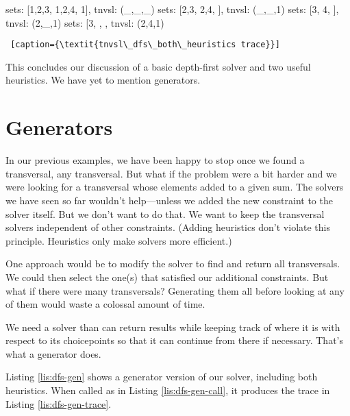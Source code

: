 \midiumlv
\begin{minipage}[c]{0.45\textwidth}
\begin{python1} 
sets: [{1,2,3}, {1,2,4}, {1}], tnvsl: (_,_,_)
  sets: [{2,3}, {2,4}, {}], tnvsl: (_,_,1)
    sets: [{3}, {4}, {}], tnvsl: (2,_,1)
      sets: [{3}, {}, {}, tnvsl: (2,4,1)
\end{python1}\linv
\begin{lstlisting} [caption={\textit{tnvsl\_dfs\_both\_heuristics trace}}]
\end{lstlisting}
\end{minipage}

This concludes our discussion of a basic depth-first solver and two useful heuristics. We have yet to mention generators.

\section{Generators} \label{sec:generators}
In our previous examples, we have been happy to stop once we found a transversal,  any transversal. But what if the problem were a bit harder and we were looking for a transversal whose elements added to a given sum. The solvers we have seen so far wouldn't help---unless we added the new constraint to the solver itself. But we don't want to do that. We want to keep the transversal solvers independent of other constraints. (Adding heuristics don't violate this principle. Heuristics only make solvers more efficient.)

One approach would be to modify the solver to find and return all transversals. We could then select the one(s) that satisfied our additional constraints. But what if there were many transversals? Generating them all before looking at any of them would waste a colossal amount of time. 

We need a solver than can return results while keeping track of where it is with respect to its choicepoints so that it can continue from there if necessary. That's what a generator does. 

Listing \ref{lis:dfs-gen} shows a generator version of our solver, including both heuristics. When called as in Listing \ref{lis:dfs-gen-call}, it produces the trace in Listing \ref{lis:dfs-gen-trace}. 


